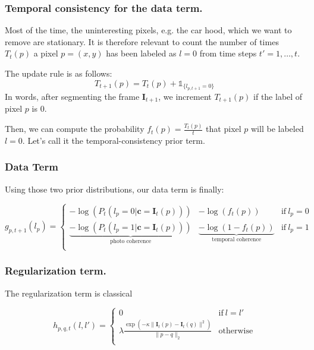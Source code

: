 \documentclass[a4paper,twoside,10pt]{article}
\begin{document}
\subsubsection{Temporal consistency for the data term.}
Most of the time, the uninteresting pixels, e.g. the car hood, which we want to remove are stationary. It is therefore relevant to count the number of times $T_t(p)$ a pixel $p=(x,y)$ has been labeled as $l=0$ from time steps $t'=1,\dots,t$.

The update rule is as follows:
\begin{equation}
T_{t+1}(p) = T_t(p) + \mathds{1}_{\{l_{p,t+1} = 0\}}
\end{equation}
In words, after segmenting the frame $\mathbf{I}_{t+1}$, we increment $T_{t+1}(p)$ if the label of pixel $p$ is $0$.

Then, we can compute the probability $f_t(p) = \frac{T_t(p)}{t}$ that pixel $p$ will be labeled $l=0$. Let's call it the temporal-consistency prior term.


\subsubsection{Data Term}
Using those two prior distributions, our data term is finally:

\begin{equation}
g_{p,t+1}(l_p) = \displaystyle \left\{\begin{array}{ccc}
-\log(P_t(l_p=0 | \mathbf{c}=\mathbf{I}_t(p))) & -\log(f_t(p)) & \text{if}\ l_p = 0 \\
\underbrace{-\log(P_t(l_p=1 | \mathbf{c}=\mathbf{I}_t(p)))}_{\text{photo coherence}} & \underbrace{- \log(1-f_t(p))}_{\text{temporal coherence}} & \text{if}\ l_p = 1 \\
\end{array} \right.
\end{equation}



\subsubsection{Regularization term.}
The regularization term is classical

\begin{equation}
h_{p,q,t}(l, l') = \displaystyle \left\{\begin{array}{cc}
0 & \textrm{if} \ l = l' \\
\lambda \frac{\exp(-\kappa \|\mathbf{I}_t(p) - \mathbf{I}_t(q)\|^2)}{\|p-q\|_2} & \text{otherwise}\\
\end{array}\right.
\end{equation}
\end{document}
